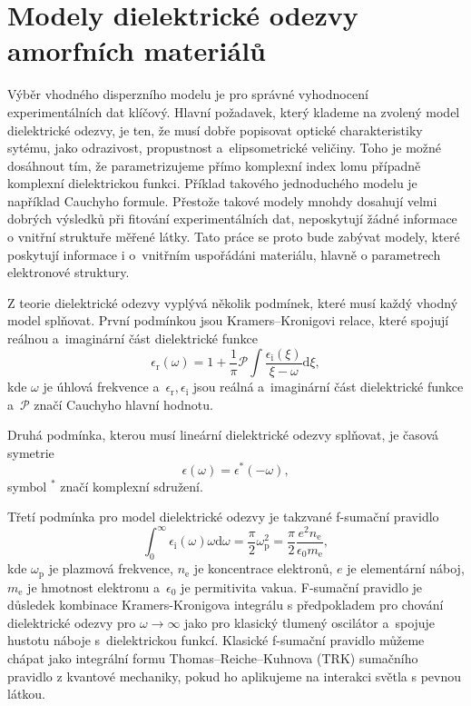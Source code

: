 \chapter{Modely dielektrické odezvy amorfních materiálů}

Výběr vhodného disperzního modelu je pro správné vyhodnocení experimentálních dat klíčový. Hlavní požadavek, který klademe na zvolený model dielektrické odezvy, je ten, že musí dobře popisovat optické charakteristiky sytému, jako odrazivost, propustnost a~elipsometrické veličiny. Toho je možné dosáhnout tím, že parametrizujeme přímo komplexní index lomu případně komplexní dielektrickou funkci. Příklad takového jednoduchého modelu je například Cauchyho formule. Přestože takové modely mnohdy dosahují velmi dobrých výsledků při fitování experimentálních dat, neposkytují žádné informace o vnitřní struktuře měřené látky. Tato práce se proto bude zabývat modely, které poskytují informace i o~vnitřním uspořádáni materiálu, hlavně o parametrech elektronové struktury.

Z teorie dielektrické odezvy vyplývá několik podmínek, které musí každý vhodný model splňovat. První podmínkou jsou Kramers--Kronigovi relace, které spojují reálnou a~ima\-gi\-nární část dielektrické funkce  
\begin{equation}
\epsilon_\mathrm{r}(\omega) = 1 + \frac{1}{\pi} \mathcal{P} \int \frac{\epsilon_\mathrm{i}(\xi)}{\xi - \omega} \mathrm{d}\xi \mathrm{,}
\label{KKint}
\end{equation}
kde $\omega$ je úhlová frekvence a~$\epsilon_\mathrm{r}, \epsilon_\mathrm{i}$ jsou reálná a~imaginární část dielektrické funkce a~$\mathcal{P}$ značí Cauchyho hlavní hodnotu. 

Druhá podmínka, kterou musí lineární dielektrické odezvy splňovat, je časová symetrie
\begin{equation}
\epsilon(\omega) =\epsilon^* (-\omega) \mathrm{,}
\label{casovasymetrie}
\end{equation}
symbol $^*$ značí komplexní sdružení.

Třetí podmínka pro model dielektrické odezvy je takzvané f-sumační pravidlo
\begin{equation}
\int_0^\infty \epsilon_\mathrm{i} (\omega) \omega \mathrm{d} \omega = \frac{\pi}{2} \omega_\mathrm{p}^2 = \frac{\pi}{2} \frac{e^2 n_\mathrm{e}}{ \epsilon_0 m_\mathrm{e}} \mathrm{,}
\end{equation}
kde $\omega_\mathrm{p}$ je plazmová frekvence, $n_\mathrm{e}$ je koncentrace elektronů, $e$ je elementární náboj, $m_\mathrm{e}$ je hmotnost elektronu a~$\epsilon_0$ je permitivita vakua. F-sumační pravidlo je důsledek kombinace Kramers-Kronigova integrálu s předpokladem pro chování dielektrické odezvy pro $\omega \rightarrow \infty$ jako pro klasický tlumený oscilátor a~spojuje hustotu náboje s~dielektrickou funkcí. Klasické f-sumační pravidlo můžeme chápat jako integrální formu Thomas--Reiche--Kuhnova (TRK) sumačního pravidlo z kvantové mechaniky, pokud ho aplikujeme na interakci světla s pevnou látkou.  

